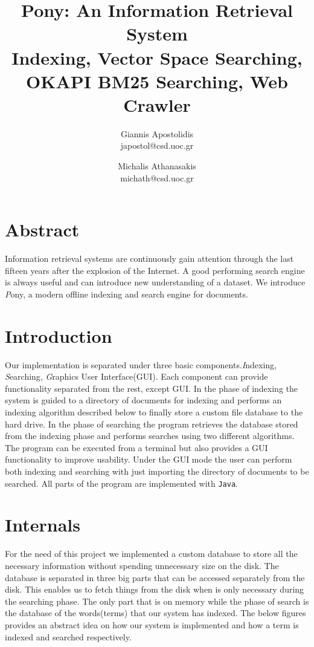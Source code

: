 \documentclass[letterpaper,twocolumn,10pt]{article}
\begin{document}
\date{}

\title{\Large Pony: An Information Retrieval System \\ \small Indexing, Vector Space Searching, OKAPI BM25 Searching, Web Crawler}


\author{{\rm Giannis Apostolidis}\\
				{\rm japostol@csd.uoc.gr}\\
				\and
				{\rm Michalis Athanasakis}\\
				{\rm michath@csd.uoc.gr}\\
}
\maketitle
\section{Abstract}
Information retrieval systems are continuously gain attention through the last fifteen years after the explosion of the Internet. A good performing search engine is always useful and can introduce new understanding of a dataset. We introduce {\emph Pony}, a modern offline indexing and search engine for documents.

\section{Introduction}
Our implementation is separated under three basic components.{\emph Indexing}, {\emph Searching}, {\emph Graphics User Interface}(GUI). Each component can provide functionality separated from the rest, except GUI. In the phase of indexing the system is guided to a directory of documents for indexing and performs an indexing algorithm described below to finally store a custom file database to the hard drive. In the phase of searching the program retrieves the database stored from the indexing phase and performs searches using two different algorithms. The program can be executed from a terminal but also provides a GUI functionality to improve usability. Under the GUI mode the user can perform both indexing and searching with just importing the directory of documents to be searched. All parts of the program are implemented with {\tt Java}.

\section{Internals}
For the need of this project we implemented a custom database to store all the necessary information without spending unnecessary size on the disk. The database is separated in three big parts that can be accessed separately from the disk. This enables us to fetch things from the disk when is only necessary during the searching phase. The only part that is on memory while the phase of search is the database of the words(terms) that our system has indexed. The below figures provides an abstract idea on how our system is implemented and how a term is indexed and searched respectively.
\end{document}
